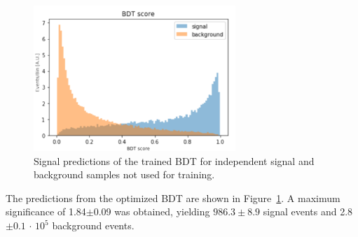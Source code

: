 \begin{figure}[!h]
\begin{center}
\includegraphics[width=3in]{BDT/bdt_pred_v2}
\caption{Signal predictions of the trained BDT for independent signal and background samples not used for training.}
\label{fig:bdt_pred}
\end{center}
\end{figure}

The predictions from the optimized BDT are shown in Figure~\ref{fig:bdt_pred}. A maximum significance of 1.84$\pm$0.09 was obtained, yielding $986.3 \pm 8.9$ signal events and 2.8$\pm 0.1$ $\cdot$ $10^5$ background events. 
